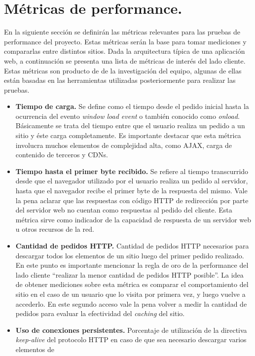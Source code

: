 
\section{ Métricas de performance. }

En la siguiente sección se definirán las métricas relevantes para las pruebas de performance del proyecto. Estas métricas serán la base para tomar mediciones y compararlas entre 
distintos sitios. Dada la arquitectura típica de una aplicación web, a continuación se presenta una lista de métricas de interés del lado cliente. Estas métricas son producto de
de la investigación del equipo, algunas de ellas están basadas en las herramientas utilizadas posteriormente para realizar las pruebas.

\begin{itemize}
	\item
	\textbf{Tiempo de carga.} Se define como el tiempo desde el pedido inicial hasta la ocurrencia del evento \emph{window load event} o también conocido como \emph{onload}.
	Básicamente se trata del tiempo entre que el usuario realiza un pedido a un sitio y éste carga completamente. Es importante destacar que esta métrica involucra muchos elementos
	de complejidad alta, como AJAX, carga de contenido de terceros y CDNs.
	\item
	\textbf{Tiempo hasta el primer byte recibido.} Se refiere al tiempo transcurrido desde que el navegador utilizado por el usuario realiza un pedido al servidor, hasta que el
	navegador recibe el primer byte de la respuesta del mismo. Vale la pena aclarar que las respuestas con código HTTP de redirección por parte del servidor web no cuentan como
	respuestas al pedido del cliente. Esta métrica sirve como indicador de la capacidad de respuesta de un servidor web u otros recursos de la red.
	\item
	\textbf{Cantidad de pedidos HTTP.} Cantidad de pedidos HTTP necesarios para descargar todos los elementos de un sitio luego del primer pedido realizado. En este punto es
	importante mencionar la regla de oro de la performance del lado cliente ``realizar la menor cantidad de pedidos HTTP posible''. La idea de obtener mediciones sobre esta métrica es
	comparar el comportamiento del sitio en el caso de un usuario que lo visita por primera vez, y luego vuelve a accederlo. En este segundo acceso vale la pena volver a medir
	la cantidad de pedidos para evaluar la efectividad del \emph{caching} del sitio.
	\item
	\textbf{Uso de conexiones persistentes.} Porcentaje de utilización de la directiva \emph{keep-alive} del protocolo HTTP en caso de que sea necesario descargar varios elementos de

\end{itemize}

